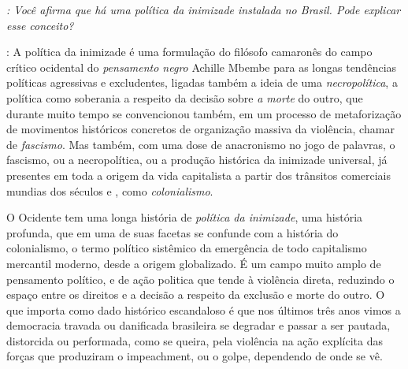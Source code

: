 \noindent\emph{: Você afirma que há uma política da inimizade instalada no Brasil. Pode
explicar esse conceito?}

\noindent{}: A política da inimizade é uma formulação do filósofo camaronês do campo
crítico ocidental do \emph{pensamento negro} Achille Mbembe para as
longas tendências políticas agressivas e excludentes, ligadas também a
ideia de uma \emph{necropolítica}, a política como soberania a respeito
da decisão sobre \emph{a morte} do outro, que durante muito tempo se
convencionou também, em um processo de metaforização de movimentos
históricos concretos de organização massiva da violência, chamar de
\emph{fascismo}. Mas também, com uma dose de anacronismo no jogo de
palavras, o fascismo, ou a necropolítica, ou a produção histórica da
inimizade universal, já presentes em toda a origem da vida capitalista a
partir dos trânsitos comerciais mundias dos séculos  e , como
\emph{colonialismo}.

O Ocidente tem uma longa história de \emph{política da inimizade}, uma
história profunda, que em uma de suas facetas se confunde com a história
do colonialismo, o termo político sistêmico da emergência de todo
capitalismo mercantil moderno, desde a origem globalizado. É um campo
muito amplo de pensamento político, e de ação politica que tende à
violência direta, reduzindo o espaço entre os direitos e a decisão a
respeito da exclusão e morte do outro. O que importa como dado histórico
escandaloso é que nos últimos três anos vimos a democracia travada ou
danificada brasileira se degradar e passar a ser pautada, distorcida ou
performada, como se queira, pela violência na ação explícita das forças
que produziram o impeachment, ou o golpe, dependendo de onde se vê.

